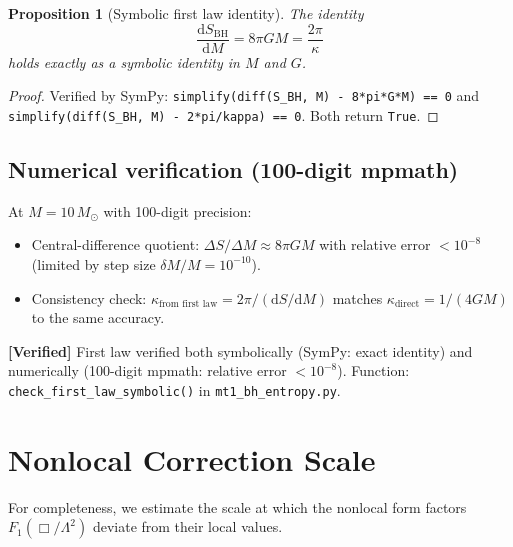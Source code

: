 \documentclass[11pt,a4paper]{article}
\renewcommand{\dd}{\mathrm{d}}
\theoremstyle{plain}
\newtheorem{proposition}[theorem]{Proposition}
\theoremstyle{definition}
\newcommand{\verified}[1]{%
  \par\smallskip\noindent
  \colorbox{green!10}{\parbox{\dimexpr\linewidth-2\fboxsep}{%
    \textcolor{green!50!black}{\textbf{[Verified]}} #1}}%
  \par\smallskip}
\begin{document}
\begin{proposition}[Symbolic first law identity]\label{prop:symbolic-first}
The identity
\begin{equation}
  \frac{\dd S_{\mathrm{BH}}}{\dd M} = 8\pi G M = \frac{2\pi}{\kappa}
\end{equation}
holds \emph{exactly} as a symbolic identity in $M$ and $G$.
\end{proposition}

\begin{proof}
Verified by SymPy: \texttt{simplify(diff(S\_BH, M) - 8*pi*G*M) == 0}
and \texttt{simplify(diff(S\_BH, M) - 2*pi/kappa) == 0}. Both return
\texttt{True}.
\end{proof}

\subsection{Numerical verification (100-digit mpmath)}

At $M = 10\,M_\odot$ with 100-digit precision:
\begin{itemize}[nosep]
  \item Central-difference quotient:
    $\Delta S/\Delta M \approx 8\pi G M$ with relative error $< 10^{-8}$
    (limited by step size $\delta M/M = 10^{-10}$).
  \item Consistency check: $\kappa_{\text{from first law}} = 2\pi/(\dd S/\dd M)$
    matches $\kappa_{\text{direct}} = 1/(4GM)$ to the same accuracy.
\end{itemize}

\verified{First law verified both symbolically (SymPy: exact identity)
and numerically (100-digit mpmath: relative error $< 10^{-8}$).
Function: \texttt{check\_first\_law\_symbolic()} in
\texttt{mt1\_bh\_entropy.py}.}


\section{Nonlocal Correction Scale}
\label{sec:nonlocal-scale}

For completeness, we estimate the scale at which the nonlocal
form factors $F_1(\Box/\Lambda^2)$ deviate from their local values.
\end{document}
